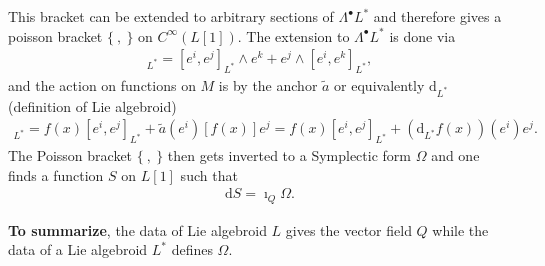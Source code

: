 \documentclass{article}
\newcommand{\bracp}{\{\ ,\ \}}
\def\w{\wedge}
\newcommand{\rd}{\mathrm{d}}
\def\tl{\tilde}
\theoremstyle{definition}
\theoremstyle{definition}
\theoremstyle{remark}
\theoremstyle{ref}
\begin{document}
This bracket can be extended to arbitrary sections of $\Lambda^\bullet L^*$ and therefore gives a poisson bracket $\bracp$ on $C^\infty(L[1])$. The extension to $\Lambda^\bullet L^*$ is done via
\begin{align*}
[e^i,e^j\w e^k]_{L^*}=[e^i,e^j]_{L^*}\w e^k+e^j\w [e^i,e^k]_{L^*},
\end{align*}
and the action on functions on $M$ is by the anchor $\tl{a}$ or equivalently $\rd_{L^*}$ (definition of Lie algebroid)
\begin{align*}
[e^i,f(x)e^j]_{L^*}=f(x)[e^i,e^j]_{L^*}+\tl{a}(e^i)[f(x)] e^j=f(x)[e^i,e^j]_{L^*}+(\rd_{L^*}f(x))(e^i)e^j.
\end{align*}
The Poisson bracket $\bracp$ then gets inverted to a Symplectic form $\Omega$ and one finds a function $S$ on $L[1]$ such that 
\begin{align}\label{eq:S_def}
\rd S=\imath_Q\Omega.
\end{align}

{\bf To summarize}, the data of Lie algebroid $L$ gives the vector field $Q$ while the data of a Lie algebroid $L^*$ defines $\Omega$.
\end{document}
